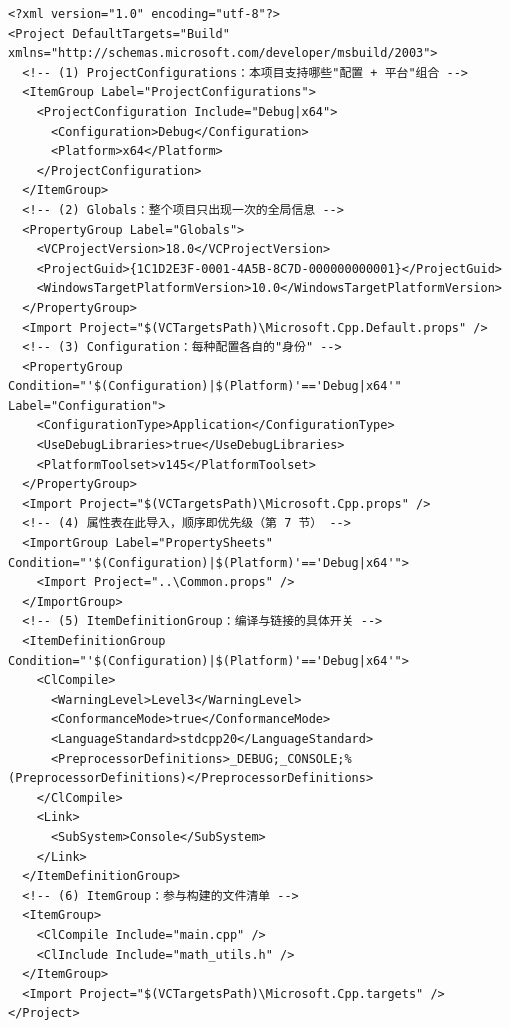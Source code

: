 \begin{lstlisting}[style=xmlstyle]
<?xml version="1.0" encoding="utf-8"?>
<Project DefaultTargets="Build" xmlns="http://schemas.microsoft.com/developer/msbuild/2003">
  <!-- (1) ProjectConfigurations：本项目支持哪些"配置 + 平台"组合 -->
  <ItemGroup Label="ProjectConfigurations">
    <ProjectConfiguration Include="Debug|x64">
      <Configuration>Debug</Configuration>
      <Platform>x64</Platform>
    </ProjectConfiguration>
  </ItemGroup>
  <!-- (2) Globals：整个项目只出现一次的全局信息 -->
  <PropertyGroup Label="Globals">
    <VCProjectVersion>18.0</VCProjectVersion>
    <ProjectGuid>{1C1D2E3F-0001-4A5B-8C7D-000000000001}</ProjectGuid>
    <WindowsTargetPlatformVersion>10.0</WindowsTargetPlatformVersion>
  </PropertyGroup>
  <Import Project="$(VCTargetsPath)\Microsoft.Cpp.Default.props" />
  <!-- (3) Configuration：每种配置各自的"身份" -->
  <PropertyGroup Condition="'$(Configuration)|$(Platform)'=='Debug|x64'" Label="Configuration">
    <ConfigurationType>Application</ConfigurationType>
    <UseDebugLibraries>true</UseDebugLibraries>
    <PlatformToolset>v145</PlatformToolset>
  </PropertyGroup>
  <Import Project="$(VCTargetsPath)\Microsoft.Cpp.props" />
  <!-- (4) 属性表在此导入，顺序即优先级（第 7 节） -->
  <ImportGroup Label="PropertySheets" Condition="'$(Configuration)|$(Platform)'=='Debug|x64'">
    <Import Project="..\Common.props" />
  </ImportGroup>
  <!-- (5) ItemDefinitionGroup：编译与链接的具体开关 -->
  <ItemDefinitionGroup Condition="'$(Configuration)|$(Platform)'=='Debug|x64'">
    <ClCompile>
      <WarningLevel>Level3</WarningLevel>
      <ConformanceMode>true</ConformanceMode>
      <LanguageStandard>stdcpp20</LanguageStandard>
      <PreprocessorDefinitions>_DEBUG;_CONSOLE;%(PreprocessorDefinitions)</PreprocessorDefinitions>
    </ClCompile>
    <Link>
      <SubSystem>Console</SubSystem>
    </Link>
  </ItemDefinitionGroup>
  <!-- (6) ItemGroup：参与构建的文件清单 -->
  <ItemGroup>
    <ClCompile Include="main.cpp" />
    <ClInclude Include="math_utils.h" />
  </ItemGroup>
  <Import Project="$(VCTargetsPath)\Microsoft.Cpp.targets" />
</Project>
\end{lstlisting}


